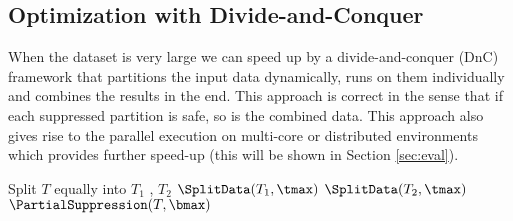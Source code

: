 %
%
%

\subsection{Optimization with Divide-and-Conquer}
\label{algo:impmentation}

When the dataset is very large we can speed up by
a divide-and-conquer (DnC) framework that
partitions the input data dynamically,
runs \PartialSuppression
on them individually and combines the results in the end. This approach is
correct in the sense that if each suppressed partition is safe, so is the
combined data. This approach also gives rise to the parallel execution
on multi-core or distributed environments which provides further speed-up
(this will be shown in Section \ref{sec:eval}).

\begin{algorithm}
\caption{$\SplitData(T,\tmax)$} \label{algo:splitdata}
\begin{algorithmic}[1]
        \STATE Split $T$ equally into $T_1$ , $T_2$
        \STATE $\SplitData(T_1,  \tmax)$
        \STATE $\SplitData(T_2, \tmax)$
    \ELSE
        \STATE $\PartialSuppression(T,  \bmax)$
    \ENDIF
\end{algorithmic}
\end{algorithm}

